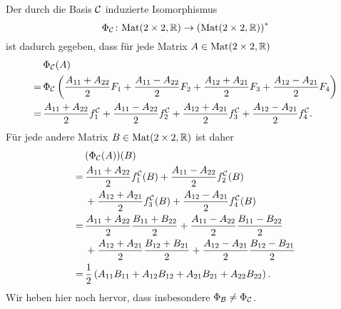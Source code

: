 \documentclass[a4paper,10pt]{article}
\begin{document}
Der durch die Basis $\mathcal{C}$ induzierte Isomorphismus
\[
 \Phi_{\mathcal{C}} \colon \mathrm{Mat}(2 \times 2, \mathbb{R}) \to \left( \mathrm{Mat}(2 \times 2, \mathbb{R}) \right)^*
\]
ist dadurch gegeben, dass für jede Matrix $A \in \mathrm{Mat}(2 \times 2, \mathbb{R})$
\begin{align*}
  &\, \Phi_{\mathcal{C}}(A) \\
 =&\, \Phi_{\mathcal{C}}\left( \frac{A_{11}+A_{22}}{2} F_1 + \frac{A_{11}-A_{22}}{2} F_2 + \frac{A_{12}+A_{21}}{2} F_3 + \frac{A_{12}-A_{21}}{2} F_4 \right) \\
 =&\, \frac{A_{11}+A_{22}}{2} f^{\mathcal{C}}_1 + \frac{A_{11}-A_{22}}{2} f^{\mathcal{C}}_2 + \frac{A_{12}+A_{21}}{2} f^{\mathcal{C}}_3 + \frac{A_{12}-A_{21}}{2} f^{\mathcal{C}}_4.
\end{align*}
Für jede andere Matrix $B \in \mathrm{Mat}(2 \times 2, \mathbb{R})$ ist daher
\begin{align*}
  &\, (\Phi_{\mathcal{C}}(A))(B) \\
 =&\, \frac{A_{11}+A_{22}}{2} f^{\mathcal{C}}_1(B)
      + \frac{A_{11}-A_{22}}{2} f^{\mathcal{C}}_2(B) \\
  &\, + \frac{A_{12}+A_{21}}{2} f^{\mathcal{C}}_3(B)
      + \frac{A_{12}-A_{21}}{2} f^{\mathcal{C}}_4(B) \\
 =&\, \frac{A_{11}+A_{22}}{2} \frac{B_{11}+B_{22}}{2}
      + \frac{A_{11}-A_{22}}{2} \frac{B_{11}-B_{22}}{2} \\
  &\, + \frac{A_{12}+A_{21}}{2} \frac{B_{12}+B_{21}}{2}
      + \frac{A_{12}-A_{21}}{2} \frac{B_{12}-B_{21}}{2} \\
 =&\, \frac{1}{2}\left( A_{11} B_{11} + A_{12} B_{12} + A_{21} B_{21} + A_{22} B_{22} \right).
\end{align*}
Wir heben hier noch hervor, dass insbesondere $\Phi_{\mathcal{B}} \neq \Phi_{\mathcal{C}}$.
\end{document}
